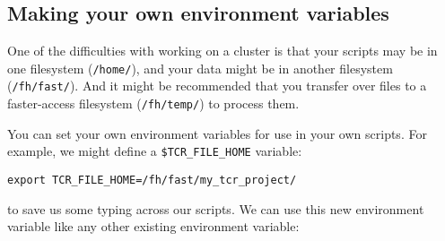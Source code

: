 \documentclass[
  letterpaper,
  DIV=11,
  numbers=noendperiod]{scrreprt}
\newenvironment{Shaded}{\begin{snugshade}}{\end{snugshade}}
\newcommand{\BuiltInTok}[1]{\textcolor[rgb]{0.00,0.23,0.31}{#1}}
\newcommand{\CommentTok}[1]{\textcolor[rgb]{0.37,0.37,0.37}{#1}}
\newcommand{\NormalTok}[1]{\textcolor[rgb]{0.00,0.23,0.31}{#1}}
\newcommand{\OperatorTok}[1]{\textcolor[rgb]{0.37,0.37,0.37}{#1}}
\newcommand{\VariableTok}[1]{\textcolor[rgb]{0.07,0.07,0.07}{#1}}
\begin{document}
\subsection{Making your own environment
variables}\label{making-your-own-environment-variables}

One of the difficulties with working on a cluster is that your scripts
may be in one filesystem (\texttt{/home/}), and your data might be in
another filesystem (\texttt{/fh/fast/}). And it might be recommended
that you transfer over files to a faster-access filesystem
(\texttt{/fh/temp/}) to process them.

You can set your own environment variables for use in your own scripts.
For example, we might define a \texttt{\$TCR\_FILE\_HOME} variable:

\begin{verbatim}
export TCR_FILE_HOME=/fh/fast/my_tcr_project/
\end{verbatim}

to save us some typing across our scripts. We can use this new
environment variable like any other existing environment variable:

\begin{Shaded}
\end{Shaded}
\end{document}
